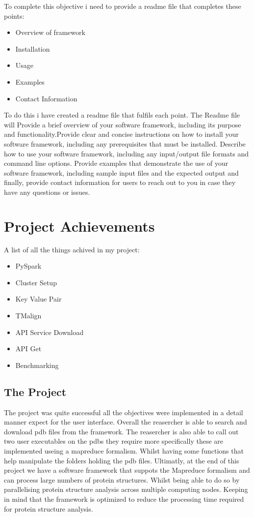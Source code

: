 \documentclass[]{final_report}
\begin{document}
To complete this objective i need to provide a readme file that completes these points:

\begin{itemize}
    \item Overview of framework
    \item Installation
    \item Usage
    \item Examples
    \item Contact Information
\end{itemize}

To do this i have created a readme file that fulfils each point. The Readme file will Provide a brief overview of your software framework, including its purpose and functionality.Provide clear and concise instructions on how to install your software framework, including any prerequisites that must be installed. Describe how to use your software framework, including any input/output file formats and command line options. Provide examples that demonstrate the use of your software framework, including sample input files and the expected output and finally, provide contact information for users to reach out to you in case they have any questions or issues.

\section{Project Achievements}
A list of all the things achived in my project:

\begin{itemize}
    \item PySpark
    \item Cluster Setup
    \item Key Value Pair
    \item TMalign
    \item API Service Download
    \item API Get
    \item Benchmarking
\end{itemize}

\subsection{The Project}

The project was quite successful all the objectives were implemented in a detail manner expect for the user interface. Overall the reasercher is able to search and download pdb files from the framework. The reasercher is also able to call out two user executables on the pdbs they require more specifically these are implemented useing a mapreduce formalism. Whilst having some functions that help manipulate the folders holding the pdb files. Ultimatly, at the end of this project we have a software framework that suppots the Mapreduce formalism and can process large numbers of protein structures. Whilst being able to do so by parallelising protein structure analysis across multiple computing nodes. Keeping in mind that the framework is optimized to reduce the processing time required for protein structure analysis.
\end{document}
